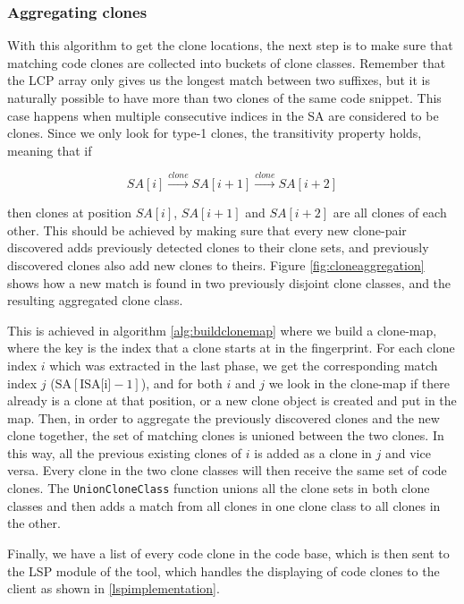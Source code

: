 \subsubsection{Aggregating clones}

With this algorithm to get the clone locations, the next step is to make sure that
matching code clones are collected into buckets of clone classes. Remember that the LCP
array only gives us the longest match between two suffixes, but it is naturally possible
to have more than two clones of the same code snippet. This case happens when multiple
consecutive indices in the SA are considered to be clones. Since we only look for type-1
clones, the transitivity property holds, meaning that if

$$
SA[i] \xrightarrow{clone} SA[i+1] \xrightarrow{clone} SA[i + 2]
$$

then clones at position $SA[i]$, $SA[i+1]$ and $SA[i + 2]$ are all clones of each other.
This should be achieved by making sure that every new clone-pair discovered adds
previously detected clones to their clone sets, and previously discovered clones also add
new clones to theirs. Figure \ref{fig:cloneaggregation} shows how a new match is found in
two previously disjoint clone classes, and the resulting aggregated clone class.

This is achieved in algorithm \ref{alg:buildclonemap} where we build a clone-map, where
the key is the index that a clone starts at in the fingerprint. For each clone index $i$
which was extracted in the last phase, we get the corresponding match index $j$
($\text{SA}[\text{ISA[i]} - 1]$), and for both $i$ and $j$ we look in the clone-map if
there already is a clone at that position, or a new clone object is created and put in the
map. Then, in order to aggregate the previously discovered clones and the new clone
together, the set of matching clones is unioned between the two clones. In this way, all
the previous existing clones of $i$ is added as a clone in $j$ and vice versa. Every clone
in the two clone classes will then receive the same set of code clones. The
\verb|UnionCloneClass| function unions all the clone sets in both clone classes and then
adds a match from all clones in one clone class to all clones in the other.

Finally, we have a list of every code clone in the code base, which is then sent to the
LSP module of the tool, which handles the displaying of code clones to the client as
shown in \cref{lspimplementation}.

